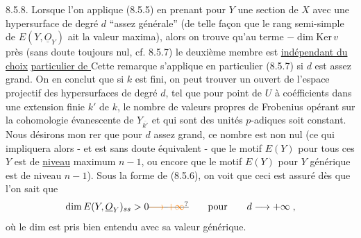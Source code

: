 8.5.8. Lorsque  l'on applique (8.5.5) en prenant pour $Y$ une section de $X$ avec une hypersurface de degré $d$ ``assez générale'' (de telle façon que le rang semi-simple de $E(Y,\underline O_Y)$ ait la valeur maxima), alors on trouve qu'au terme $-\dim\mathrm{Ker}\,v$ près (sans doute toujours nul, cf. 8.5.7) le deuxième membre est \uline{indépendant du choix}  \uline{particulier de } Cette remarque s'applique en particulier (8.5.7) si $d$ est assez grand. On en conclut que si $k$ est fini,  on peut trouver un ouvert  de l'espace projectif des hypersurfaces de degré $d$, tel que pour   point  de $U$ à coéfficients dans une extension finie $k'$ de $k$, le nombre de valeurs propres de Frobenius opérant sur la cohomologie évanescente de $Y_{\overline{k'}}$ et qui sont des unités $p$-adiques soit constant.  Nous désirons mon%
%
rer que pour $d$ assez grand, ce nombre est non nul (ce qui impliquera  alors\deleted{\unsure{,}} - et est sans doute équivalent - que le motif $E(Y)$ pour tous ces $Y$ est de \uline{niveau} maximum $n-1$, ou encore que le motif $E(Y)$ pour $Y$ générique est de niveau $n-1$). Sous la forme de (8.5.6)\deleted{\unsure{,}}, on voit que ceci est assuré dès que l'on sait que
\[
\dim E(Y,\underline O_Y)_{ss}\handwritten{>0}\deleted{\unsure{\longrightarrow+\infty}}\qquad\text{pour}\qquad d\handwritten{\longrightarrow}+\handwritten{\infty}\;,
\]
où le dim est pris bien entendu avec sa valeur générique. 

